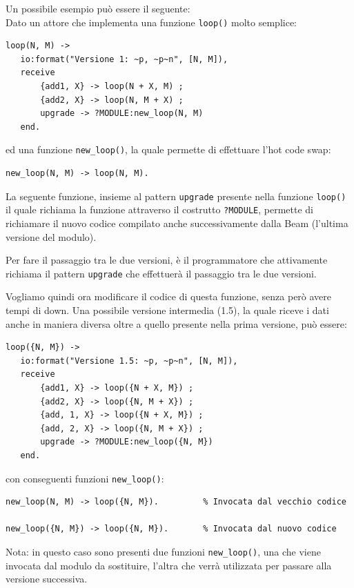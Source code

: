 \documentclass{article}
\begin{document}
Un possibile esempio può essere il seguente:\\
Dato un attore che implementa una funzione \texttt{loop()} molto semplice:
\begin{tcolorbox}
\begin{verbatim}
loop(N, M) -> 
   io:format("Versione 1: ~p, ~p~n", [N, M]),
   receive
       {add1, X} -> loop(N + X, M) ;
       {add2, X} -> loop(N, M + X) ;
       upgrade -> ?MODULE:new_loop(N, M)
   end.
\end{verbatim}
\end{tcolorbox}
ed una funzione \texttt{new\_loop()}, la quale permette di effettuare l'hot code swap:
\begin{tcolorbox}
\begin{verbatim}
new_loop(N, M) -> loop(N, M).
\end{verbatim}
\end{tcolorbox}
La seguente funzione, insieme al pattern \texttt{upgrade} presente nella funzione \texttt{loop()} il quale richiama la funzione attraverso il costrutto \texttt{?MODULE}, permette di richiamare il nuovo codice compilato anche successivamente dalla Beam (l'ultima versione del modulo).

Per fare il passaggio tra le due versioni, è il programmatore che attivamente richiama il pattern \texttt{upgrade} che effettuerà il passaggio tra le due versioni.

Vogliamo quindi ora modificare il codice di questa funzione, senza però avere tempi di down. Una possibile versione intermedia (1.5), la quale riceve i dati anche in maniera diversa oltre a quello presente nella prima versione, può essere:
\begin{tcolorbox}
\begin{verbatim}
loop({N, M}) -> 
   io:format("Versione 1.5: ~p, ~p~n", [N, M]),
   receive
       {add1, X} -> loop({N + X, M}) ;
       {add2, X} -> loop({N, M + X}) ;
       {add, 1, X} -> loop({N + X, M}) ;
       {add, 2, X} -> loop({N, M + X}) ;
       upgrade -> ?MODULE:new_loop({N, M})
   end.
\end{verbatim}
\end{tcolorbox}
con conseguenti funzioni \texttt{new\_loop()}:
\begin{tcolorbox}
\begin{verbatim}
new_loop(N, M) -> loop({N, M}).         % Invocata dal vecchio codice

new_loop({N, M}) -> loop({N, M}).       % Invocata dal nuovo codice
\end{verbatim}
\end{tcolorbox}
Nota: in questo caso sono presenti due funzioni \texttt{new\_loop()}, una che viene invocata dal modulo da sostituire, l'altra che verrà utilizzata per passare alla versione successiva.
\end{document}

